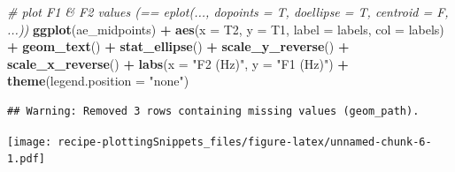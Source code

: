 \documentclass[]{book}
\newenvironment{Shaded}{\begin{snugshade}}{\end{snugshade}}
\newcommand{\CommentTok}[1]{\textcolor[rgb]{0.56,0.35,0.01}{\textit{#1}}}
\newcommand{\DataTypeTok}[1]{\textcolor[rgb]{0.13,0.29,0.53}{#1}}
\newcommand{\KeywordTok}[1]{\textcolor[rgb]{0.13,0.29,0.53}{\textbf{#1}}}
\newcommand{\NormalTok}[1]{#1}
\newcommand{\OperatorTok}[1]{\textcolor[rgb]{0.81,0.36,0.00}{\textbf{#1}}}
\newcommand{\StringTok}[1]{\textcolor[rgb]{0.31,0.60,0.02}{#1}}
\begin{document}
\begin{Shaded}
\begin{Highlighting}[]
\CommentTok{# plot F1 & F2 values (== eplot(..., dopoints = T, doellipse = T, centroid = F, ...))}
\KeywordTok{ggplot}\NormalTok{(ae_midpoints) }\OperatorTok{+}
\StringTok{  }\KeywordTok{aes}\NormalTok{(}\DataTypeTok{x =}\NormalTok{ T2, }\DataTypeTok{y =}\NormalTok{ T1, }\DataTypeTok{label =}\NormalTok{ labels, }\DataTypeTok{col =}\NormalTok{ labels) }\OperatorTok{+}
\StringTok{  }\KeywordTok{geom_text}\NormalTok{() }\OperatorTok{+}
\StringTok{  }\KeywordTok{stat_ellipse}\NormalTok{() }\OperatorTok{+}
\StringTok{  }\KeywordTok{scale_y_reverse}\NormalTok{() }\OperatorTok{+}\StringTok{ }\KeywordTok{scale_x_reverse}\NormalTok{() }\OperatorTok{+}\StringTok{ }
\StringTok{  }\KeywordTok{labs}\NormalTok{(}\DataTypeTok{x =} \StringTok{"F2 (Hz)"}\NormalTok{, }\DataTypeTok{y =} \StringTok{"F1 (Hz)"}\NormalTok{) }\OperatorTok{+}
\StringTok{  }\KeywordTok{theme}\NormalTok{(}\DataTypeTok{legend.position =} \StringTok{"none"}\NormalTok{)}
\end{Highlighting}
\end{Shaded}

\begin{verbatim}
## Warning: Removed 3 rows containing missing values (geom_path).
\end{verbatim}

\texttt{[image: recipe-plottingSnippets\_files/figure-latex/unnamed-chunk-6-1.pdf]}
\end{document}
